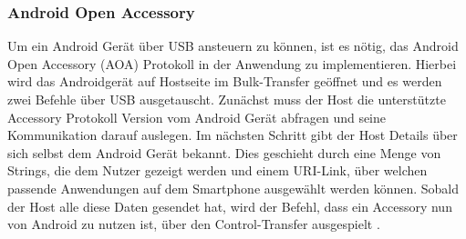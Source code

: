 	\subsubsection{Android Open Accessory}
	
	Um ein Android Gerät über USB ansteuern zu können, ist es nötig, das Android Open Accessory (AOA) Protokoll in der Anwendung zu implementieren. Hierbei wird das Androidgerät auf Hostseite im Bulk-Transfer geöffnet und es werden zwei Befehle über USB ausgetauscht. Zunächst muss der Host die unterstützte Accessory Protokoll Version vom Android Gerät abfragen und seine Kommunikation darauf auslegen. Im nächsten Schritt gibt der Host Details über sich selbst dem Android Gerät bekannt. Dies geschieht durch eine Menge von Strings, die dem Nutzer gezeigt werden und einem URI-Link, über welchen passende Anwendungen auf dem Smartphone ausgewählt werden können. Sobald der Host alle diese Daten gesendet hat, wird der Befehl, dass ein Accessory nun von Android zu nutzen ist, über den Control-Transfer ausgespielt \cite{aoa}.